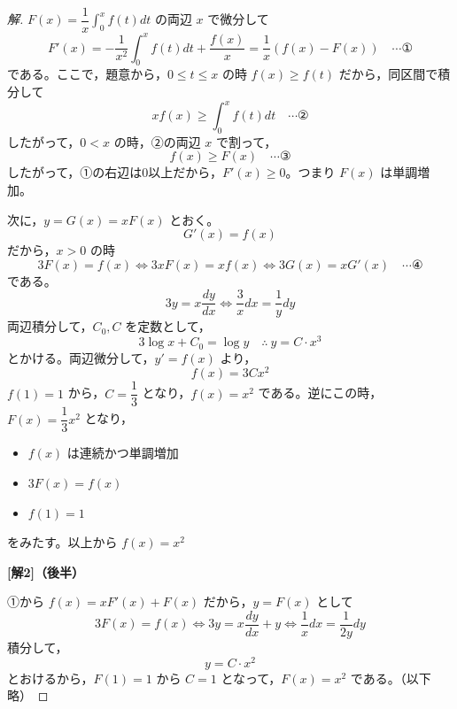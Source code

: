\documentclass[../main.tex]{subfiles}
\begin{document}
\begin{proof}[解]
  $F(x)=\dfrac{1}{x}\displaystyle\int_0^x f(t)dt$ の両辺 $x$ で微分して
  \[
    F'(x)=-\frac{1}{x^2}\int_0^x f(t)dt+\frac{f(x)}{x}=\frac{1}{x}(f(x)-F(x)) \quad \cdots \text{①}
  \]
  である。ここで，題意から，$0\le t\le x$ の時 $f(x)\ge f(t)$ だから，同区間で積分して
  \[
    xf(x)\ge\int_0^x f(t)dt \quad \cdots \text{②}
  \]
  したがって，$0<x$ の時，②の両辺 $x$ で割って，
  \[
    f(x)\ge F(x) \quad \cdots \text{③}
  \]
  したがって，①の右辺は0以上だから，$F'(x)\ge0$。つまり $F(x)$ は単調増加。

  次に，$y=G(x)=xF(x)$ とおく。
  \[
    G'(x)=f(x)
  \]
  だから，$x>0$ の時
  \[
    3F(x)=f(x) \iff 3xF(x)=xf(x) \iff 3G(x)=xG'(x) \quad \cdots \text{④}
  \]
  である。
  \[
    3y=x\frac{dy}{dx} \iff \frac{3}{x}dx=\frac{1}{y}dy
  \]
  両辺積分して，$C_0,C$ を定数として，
  \[
    3\log x+C_0=\log y \quad\therefore\ y=C\cdot x^3
  \]
  とかける。両辺微分して，$y'=f(x)$ より，
  \[
    f(x)=3Cx^2
  \]
  $f(1)=1$ から，$C=\dfrac{1}{3}$ となり，$f(x)=x^2$ である。逆にこの時，$F(x)=\dfrac{1}{3}x^2$ となり，
  \begin{itemize}
    \item $f(x)$ は連続かつ単調増加
    \item $3F(x)=f(x)$
    \item $f(1)=1$
  \end{itemize}
  をみたす。以上から $f(x)=x^2$

  \medskip
  \noindent\textbf{[解2]（後半）}

  ①から $f(x)=xF'(x)+F(x)$ だから，$y=F(x)$ として
  \[
    3F(x)=f(x) \iff 3y=x\frac{dy}{dx}+y \iff \frac{1}{x}dx=\frac{1}{2y}dy
  \]
  積分して，
  \[
    y=C\cdot x^2
  \]
  とおけるから，$F(1)=1$ から $C=1$ となって，$F(x)=x^2$ である。（以下略）
\end{proof}
\end{document}
